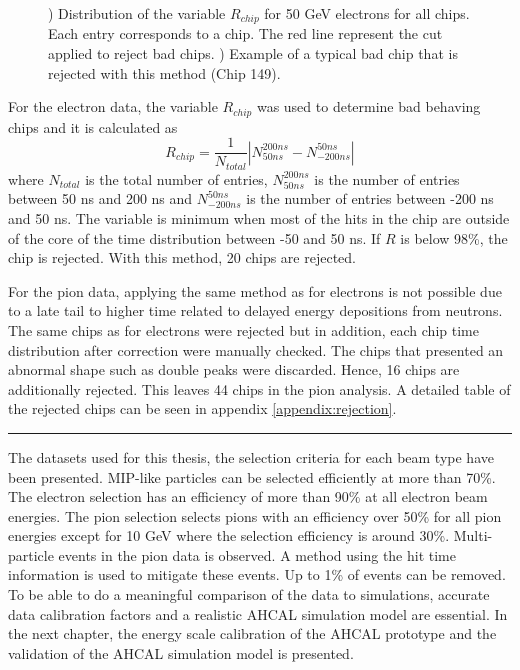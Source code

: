 \begin{figure}[htbp!]
\begin{subfigure}[t]{0.5\textwidth}
		\caption{} \label{fig:ExBadChip}
	\end{subfigure}
	\caption{) Distribution of the variable $R_{chip}$ for 50 GeV electrons for all chips. Each entry corresponds to a chip. The red line represent the cut applied to reject bad chips. ) Example of a typical bad chip that is rejected with this method (Chip 149).}
\end{figure}

For the electron data, the variable $R_{chip}$ was used to determine bad behaving chips and it is calculated as
\begin{equation} \label{eq:fraction_rejection}
	R_{chip} = \frac{1}{N_{total}} \left| N_{50 ns}^{200 ns} - N_{-200 ns}^{50 ns} \right|
\end{equation}
where $N_{total}$ is the total number of entries, $N_{50 ns}^{200 ns}$ is the number of entries between 50 ns and 200 ns and $N_{-200 ns}^{50 ns}$ is the number of entries between -200 ns and 50 ns. The variable is minimum when most of the hits in the chip are outside of the core of the time distribution between -50 and 50 ns. If $R$ is below 98\%, the chip is rejected. With this method, 20 chips are rejected.

For the pion data, applying the same method as for electrons is not possible due to a late tail to higher time related to delayed energy depositions from neutrons. The same chips as for electrons were rejected but in addition, each chip time distribution after correction were manually checked. The chips that presented an abnormal shape such as double peaks were discarded. Hence, 16 chips are additionally rejected. This leaves 44 chips in the pion analysis. A detailed table of the rejected chips can be seen in appendix \ref{appendix:rejection}.

\newpage
\begin{center}
  \rule{0.5\textwidth}{.4pt}
\end{center}

The datasets used for this thesis, the selection criteria for each beam type have been presented. MIP-like particles can be selected efficiently at more than 70\%. The electron selection has an efficiency of more than 90\% at all electron beam energies. The pion selection selects pions with an efficiency over 50\% for all pion energies except for 10 GeV where the selection efficiency is around 30\%. Multi-particle events in the pion data is observed. A method using the hit time information is used to mitigate these events. Up to 1\% of events can be removed. To be able to do a meaningful comparison of the data to simulations, accurate data calibration factors and a realistic AHCAL simulation model are essential. In the next chapter, the energy scale calibration of the AHCAL prototype and the validation of the AHCAL simulation model is presented.
